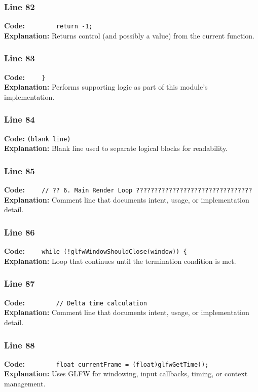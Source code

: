 \documentclass[11pt,a4paper]{article}
\begin{document}
\subsubsection*{Line 82}
\textbf{Code:} \verb|        return -1;|\\
\textbf{Explanation:} Returns control (and possibly a value) from the current function.

\subsubsection*{Line 83}
\textbf{Code:} \verb|    }|\\
\textbf{Explanation:} Performs supporting logic as part of this module's implementation.

\subsubsection*{Line 84}
\textbf{Code:} \texttt{(blank line)}\\
\textbf{Explanation:} Blank line used to separate logical blocks for readability.

\subsubsection*{Line 85}
\textbf{Code:} \verb|    // ?? 6. Main Render Loop ????????????????????????????????|\\
\textbf{Explanation:} Comment line that documents intent, usage, or implementation detail.

\subsubsection*{Line 86}
\textbf{Code:} \verb|    while (!glfwWindowShouldClose(window)) {|\\
\textbf{Explanation:} Loop that continues until the termination condition is met.

\subsubsection*{Line 87}
\textbf{Code:} \verb|        // Delta time calculation|\\
\textbf{Explanation:} Comment line that documents intent, usage, or implementation detail.

\subsubsection*{Line 88}
\textbf{Code:} \verb|        float currentFrame = (float)glfwGetTime();|\\
\textbf{Explanation:} Uses GLFW for windowing, input callbacks, timing, or context management.
\end{document}
